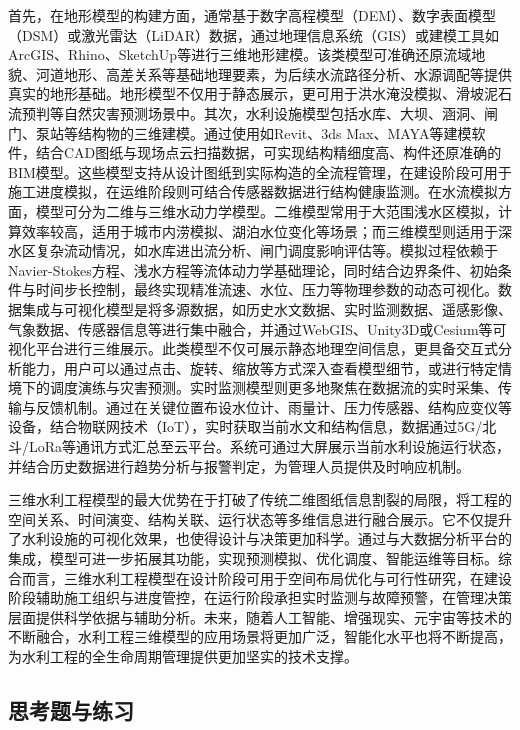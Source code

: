 首先，在地形模型的构建方面，通常基于数字高程模型（DEM）、数字表面模型（DSM）或激光雷达（LiDAR）数据，通过地理信息系统（GIS）或建模工具如ArcGIS、Rhino、SketchUp等进行三维地形建模。该类模型可准确还原流域地貌、河道地形、高差关系等基础地理要素，为后续水流路径分析、水源调配等提供真实的地形基础。地形模型不仅用于静态展示，更可用于洪水淹没模拟、滑坡泥石流预判等自然灾害预测场景中。其次，水利设施模型包括水库、大坝、涵洞、闸门、泵站等结构物的三维建模。通过使用如Revit、3ds Max、MAYA等建模软件，结合CAD图纸与现场点云扫描数据，可实现结构精细度高、构件还原准确的BIM模型。这些模型支持从设计图纸到实际构造的全流程管理，在建设阶段可用于施工进度模拟，在运维阶段则可结合传感器数据进行结构健康监测。在水流模拟方面，模型可分为二维与三维水动力学模型。二维模型常用于大范围浅水区模拟，计算效率较高，适用于城市内涝模拟、湖泊水位变化等场景；而三维模型则适用于深水区复杂流动情况，如水库进出流分析、闸门调度影响评估等。模拟过程依赖于Navier-Stokes方程、浅水方程等流体动力学基础理论，同时结合边界条件、初始条件与时间步长控制，最终实现精准流速、水位、压力等物理参数的动态可视化。数据集成与可视化模型是将多源数据，如历史水文数据、实时监测数据、遥感影像、气象数据、传感器信息等进行集中融合，并通过WebGIS、Unity3D或Cesium等可视化平台进行三维展示。此类模型不仅可展示静态地理空间信息，更具备交互式分析能力，用户可以通过点击、旋转、缩放等方式深入查看模型细节，或进行特定情境下的调度演练与灾害预测。实时监测模型则更多地聚焦在数据流的实时采集、传输与反馈机制。通过在关键位置布设水位计、雨量计、压力传感器、结构应变仪等设备，结合物联网技术（IoT），实时获取当前水文和结构信息，数据通过5G/北斗/LoRa等通讯方式汇总至云平台。系统可通过大屏展示当前水利设施运行状态，并结合历史数据进行趋势分析与报警判定，为管理人员提供及时响应机制。

三维水利工程模型的最大优势在于打破了传统二维图纸信息割裂的局限，将工程的空间关系、时间演变、结构关联、运行状态等多维信息进行融合展示。它不仅提升了水利设施的可视化效果，也使得设计与决策更加科学。通过与大数据分析平台的集成，模型可进一步拓展其功能，实现预测模拟、优化调度、智能运维等目标。综合而言，三维水利工程模型在设计阶段可用于空间布局优化与可行性研究，在建设阶段辅助施工组织与进度管控，在运行阶段承担实时监测与故障预警，在管理决策层面提供科学依据与辅助分析。未来，随着人工智能、增强现实、元宇宙等技术的不断融合，水利工程三维模型的应用场景将更加广泛，智能化水平也将不断提高，为水利工程的全生命周期管理提供更加坚实的技术支撑。

\hypertarget{ux601dux8003ux9898ux4e0eux7ec3ux4e60-4}{%
\subsection{思考题与练习}\label{ux601dux8003ux9898ux4e0eux7ec3ux4e60-4}}


